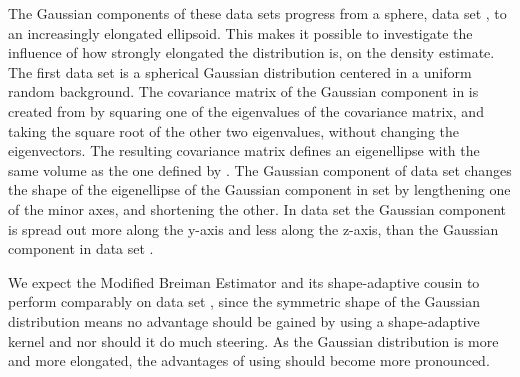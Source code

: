 The Gaussian components of these data sets progress from a sphere, \ie data set \ferdosiOne, to an increasingly elongated ellipsoid. This makes it possible to investigate the influence of how strongly elongated the distribution is, on the density estimate. 
	The first data set is a spherical Gaussian distribution centered in a uniform random background. 
	The covariance matrix of the Gaussian component in \baakmanOne is created from \ferdosiOne by squaring one of the eigenvalues of the covariance matrix, and taking the square root of the other two eigenvalues, without changing the eigenvectors. The resulting covariance matrix defines an eigenellipse with the same volume as the one defined by \ferdosiOne.
	The Gaussian component of data set \baakmanFour changes the shape of the eigenellipse of the Gaussian component in set \ferdosiOne by lengthening one of the minor axes, and shortening the other.
	In data set \baakmanFive the Gaussian component is spread out more along the y-axis and less along the z-axis, than the Gaussian component in data set \baakmanFour.

	We expect the Modified Breiman Estimator and its shape-adaptive cousin to perform comparably on data set \ferdosiOne, since the symmetric shape of the Gaussian distribution means no advantage should be gained by using a shape-adaptive kernel and nor should it do much steering. 
	As the Gaussian distribution is more and more elongated, the advantages of using \sambe should become more pronounced. 